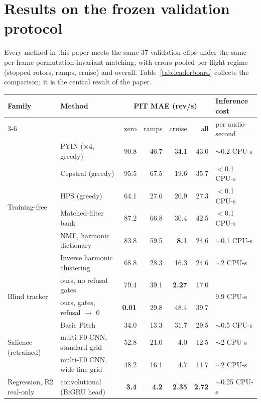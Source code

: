 \documentclass[journal]{IEEEtran}
\begin{document}
\section{Results on the frozen validation protocol}
\label{sec:leaderboard}

Every method in this paper meets the same 37 validation clips under the same
per-frame permutation-invariant matching, with errors pooled per flight
regime (stopped rotors, ramps, cruise) and overall. Table~\ref{tab:leaderboard}
collects the comparison; it is the central result of the paper.

\begin{table}[t]
\centering
\small
\begin{tabular}{llrrrrl}
\toprule
Family & Method & \multicolumn{4}{c}{PIT MAE (rev/s)} & Inference cost \\
\cmidrule(lr){3-6}
 & & zero & ramps & cruise & all & per audio-second \\
\midrule
\multirow{6}{*}{Training-free}
 & PYIN ($\times$4, greedy) & 90.8 & 46.7 & 34.1 & 43.0 & $\sim$0.2 CPU-s \\
 & Cepstral (greedy) & 95.5 & 67.5 & 19.6 & 35.7 & $<$0.1 CPU-s \\
 & HPS (greedy) & 64.1 & 27.6 & 20.9 & 27.3 & $<$0.1 CPU-s \\
 & Matched-filter bank & 87.2 & 66.8 & 30.4 & 42.5 & $<$0.1 CPU-s \\
 & NMF, harmonic dictionary & 83.8 & 59.5 & \textbf{8.1} & 24.6 & $\sim$0.1 CPU-s \\
 & Inverse harmonic clustering & 68.8 & 28.3 & 16.3 & 24.6 & $\sim$2 CPU-s \\
\midrule
\multirow{2}{*}{Blind tracker}
 & ours, no refusal gates & 79.4 & 39.1 & \textbf{2.27} & 17.0 & \multirow{2}{*}{9.9 CPU-s} \\
 & ours, gates, refusal $\to$ 0 & \textbf{0.01} & 29.8 & 48.4 & 39.7 & \\
\midrule
\multirow{3}{*}{Salience (retrained)}
 & Basic Pitch & 34.0 & 13.3 & 31.7 & 29.5 & $\sim$0.5 CPU-s \\
 & multi-F0 CNN, standard grid & 52.8 & 21.0 & 4.0 & 12.5 & $\sim$2 CPU-s \\
 & multi-F0 CNN, wide fine grid & 48.2 & 16.1 & 4.7 & 11.7 & $\sim$2 CPU-s \\
\midrule
\multirow{3}{*}{Regression, R2 real-only}
 & convolutional (BiGRU head) & \textbf{3.4} & \textbf{4.2} & \textbf{2.35} & \textbf{2.72} & \multirow{3}{*}{$\sim$0.25 CPU-s} \\

\end{tabular}
\end{table}
\end{document}
